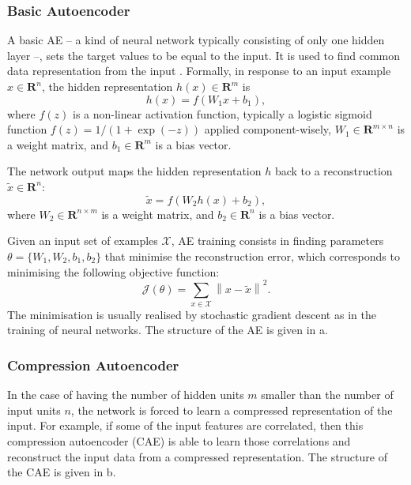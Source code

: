

\subsubsection{Basic Autoencoder}
A basic AE -- a kind of neural network typically consisting of only one hidden layer --, sets the target values to be equal to the input. It is used to find common data representation from the input \cite{Goodfellow2009-MII,Bengio2007-GLT}. Formally, in response to an input example $x\in \mathbf{R}^{n}$, the hidden representation
$h(x) \in \mathbf{R}^{m}$ is 
\begin{equation} %
  h(x) = f(W_{1}x +b_{1}), 
\end{equation}
where $f(z)$ is a non-linear activation function, typically a logistic
sigmoid function $f(z) = 1/(1+\exp(-z)) $ applied component-wisely,
$W_{1} \in \mathbf{R}^{m \times n}$ is a weight matrix, and $b_{1} \in
\mathbf{R}^{m}$ is a bias vector.

The network output maps the hidden representation $h$ back to a
reconstruction $\tilde{x} \in \mathbf{R}^{n}$:
\begin{equation} %
  \tilde{x} = f(W_{2}h(x) +b_{2}), 
\end{equation}
where $W_{2} \in \mathbf{R}^{n \times m}$ is a weight matrix, and $b_{2} \in
\mathbf{R}^{n}$ is a bias vector.

Given an input set of examples $\mathcal{X}$, AE training consists
in finding parameters $\theta=\{W_{1},W_{2},b_{1},b_{2}\}$ that
minimise the reconstruction error, which corresponds to minimising
the following objective function:
\begin{equation} %
  \mathcal{J}(\theta)=\sum_{x\in{\mathcal{X}}}\left\| x -
    \tilde{x}\right\|^{2}.
\end{equation}
The minimisation is usually realised by stochastic gradient descent as
in the training of neural networks. The structure of the AE is given in a.   

\subsubsection{Compression Autoencoder}
In the case of having the number of hidden units $m$ smaller than the number of input units $n$, the network is forced to
learn a compressed representation of the input. For example, if some of the input features are correlated, then this compression autoencoder (CAE) is able to learn those correlations and reconstruct the input data from a compressed representation. The structure of the CAE is given in b.

